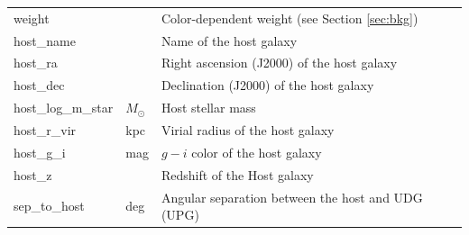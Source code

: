 \documentclass[twocolumn,astrosymb,twocolappendix]{aastex631}
\begin{document}
\begin{CJK*}{UTF8}{gbsn}
\begin{table}
\begin{center}
\begin{tabular}{l l l}
weight & & Color-dependent weight (see Section \ref{sec:bkg}) \\
host\_name & & Name of the host galaxy \\
host\_ra & & Right ascension (J2000) of the host galaxy \\
host\_dec & & Declination (J2000) of the host galaxy \\
host\_log\_m\_star & $M_\odot$ & Host stellar mass\\
host\_r\_vir & kpc & Virial radius of the host galaxy \\
host\_g\_i & mag & $g-i$ color of the host galaxy \\
host\_z &  & Redshift of the Host galaxy \\
sep\_to\_host & deg & Angular separation between the host and UDG (UPG)\\
\hline\hline
\end{tabular}
\end{center}
\end{table}

\end{CJK*}
\end{document}
